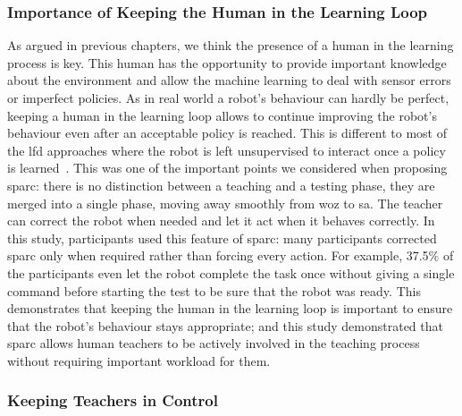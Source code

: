 \subsubsection{Importance of Keeping the Human in the Learning Loop}

As argued in previous chapters, we think the presence of a human in the learning process is key. This human has the opportunity to provide important knowledge about the environment and allow the machine learning to deal with sensor errors or imperfect policies. As in real world a robot's behaviour can hardly be perfect, keeping a human in the learning loop allows to continue improving the robot's behaviour even after an acceptable policy is reached. This is different to most of the \gls{lfd} approaches where the robot is left unsupervised to interact once a policy is learned~\citep{argall2009survey,sequeira2016discovering}. This was one of the important points we considered when proposing \gls{sparc}: there is no distinction between a teaching and a testing phase, they are merged into a single phase, moving away smoothly from \gls{woz} to \gls{sa}. The teacher can correct the robot when needed and let it act when it behaves correctly. In this study, participants used this feature of \gls{sparc}: many participants corrected \gls{sparc} only when required rather than forcing every action. For example, 37.5\% of the participants even let the robot complete the task once without giving a single command before starting the test to be sure that the robot was ready. This demonstrates that keeping the human in the learning loop is important to ensure that the robot's behaviour stays appropriate; and this study demonstrated that \gls{sparc} allows human teachers to be actively involved in the teaching process without requiring important workload for them.

\subsubsection{Keeping Teachers in Control}


